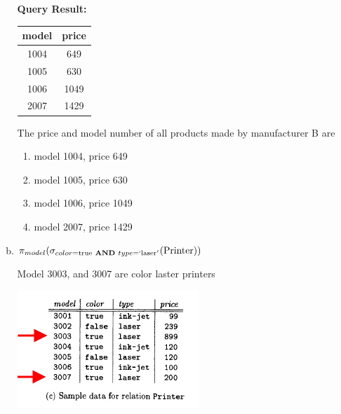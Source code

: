 \documentclass[12pt]{article}
\begin{document}
\begin{enumerate}
\begin{enumerate}[a)]
\begin{mdframed}
            \textbf{Query Result:}

            \bigskip

            \begin{tabular}{|c|c|}
                \hline
                model   &   price\\
                \hline
                1004    &   649\\
                \hline
                1005    &   630\\
                \hline
                1006    &   1049\\
                \hline
                2007    &   1429\\
                \hline
            \end{tabular}
            \color{black}

            \bigskip

            The price and model number of all products made by manufacturer B are

            \begin{enumerate}[1.]
                \item model 1004, price 649
                \item model 1005, price 630
                \item model 1006, price 1049
                \item model 2007, price 1429
            \end{enumerate}
        \end{mdframed}



        \item $\pi_{model} (\sigma_{color = \text{true} \textbf{ AND } type=`\text{laser}'}(\text{Printer}))$

        \bigskip

        Model 3003, and 3007 are color laster printers

        \begin{center}
        \includegraphics[width=0.4\linewidth]{images/worksheet_2_solution_9.png}
        \end{center}


\end{enumerate}
\end{enumerate}
\end{document}
